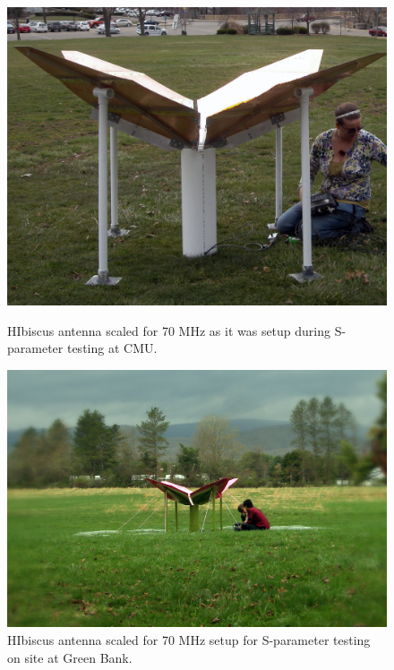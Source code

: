 \begin{figure}[htb]
\centering
\begin{minipage}[b]{0.43\textwidth}
\centering
\includegraphics[width=0.95\linewidth]{SCIHI_system/figures/HIbiscus_pgh_imp.jpg}
\caption{HIbiscus antenna scaled for 70 MHz as it was setup during S-parameter testing at CMU. }
\label{Fig:hibiscus_first}
\end{minipage}%
\begin{minipage}[b]{0.02\textwidth}
\hspace{1cm}
\end{minipage}%
\begin{minipage}[b]{0.51\textwidth}
\centering
\includegraphics[width=0.95\linewidth]{SCIHI_system/figures/HIbiscus_gbt.jpg}
\caption{HIbiscus antenna scaled for 70 MHz setup for S-parameter testing on site at Green Bank.}
\label{Fig:hibiscus_gbt}
\end{minipage}
\end{figure}

